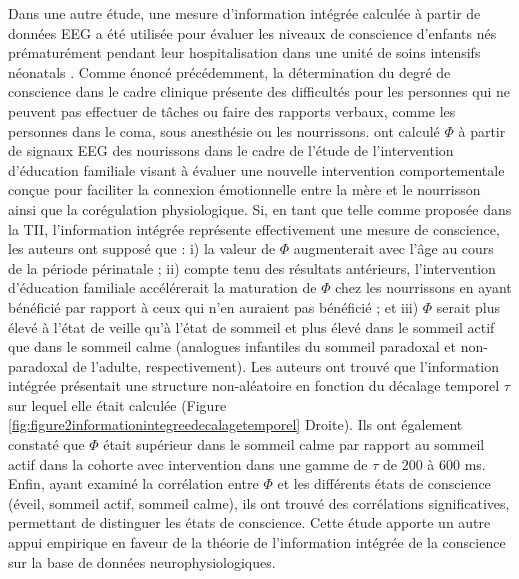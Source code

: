 Dans une autre étude, une mesure d'information intégrée calculée à partir de données EEG a été utilisée pour évaluer les niveaux de conscience d'enfants nés prématurément pendant leur hospitalisation dans une unité de soins intensifs néonatals \citep{isler2018integrated}. 
Comme énoncé précédemment, la détermination du degré de conscience dans le cadre clinique présente des difficultés pour les personnes qui ne peuvent pas effectuer de tâches ou faire des rapports verbaux, comme les personnes dans le coma, sous anesthésie ou les nourrissons. 
\cite{isler2018integrated} ont calculé $\Phi$ à partir de signaux EEG des nourissons dans le cadre de l'étude de l'intervention d'éducation familiale visant à évaluer une nouvelle intervention comportementale conçue pour faciliter la connexion émotionnelle entre la mère et le nourrisson ainsi que la corégulation physiologique. 
Si, en tant que telle comme proposée dans la TII, l'information intégrée représente effectivement une mesure de conscience, les auteurs ont supposé que : i) la valeur de $\Phi$ augmenterait avec l'âge au cours de la période périnatale ; ii) compte tenu des résultats antérieurs, l'intervention d'éducation familiale accélérerait la maturation de $\Phi$ chez les nourrissons en ayant bénéficié par rapport à ceux qui n'en auraient pas bénéficié ; et iii) $\Phi$ serait plus élevé à l'état de veille qu'à l'état de sommeil et plus élevé dans le sommeil actif que dans le sommeil calme (analogues infantiles du sommeil paradoxal et non-paradoxal de l'adulte, respectivement). 
Les auteurs ont trouvé que l'information intégrée présentait une structure non-aléatoire en fonction du décalage temporel $\tau$ sur lequel elle était calculée (Figure \ref{fig:figure2informationintegreedecalagetemporel} Droite). 
Ils ont également constaté que $\Phi$ était supérieur dans le sommeil calme par rapport au sommeil actif dans la cohorte avec intervention dans une gamme de $\tau$ de $200$ à $600$ ms. 
Enfin, ayant examiné la corrélation entre $\Phi$ et les différents états de conscience (éveil, sommeil actif, sommeil calme), ils ont trouvé des corrélations significatives, permettant de distinguer les états de conscience. 
Cette étude apporte un autre appui empirique en faveur de la théorie de l'information intégrée de la conscience sur la base de données neurophysiologiques. 

